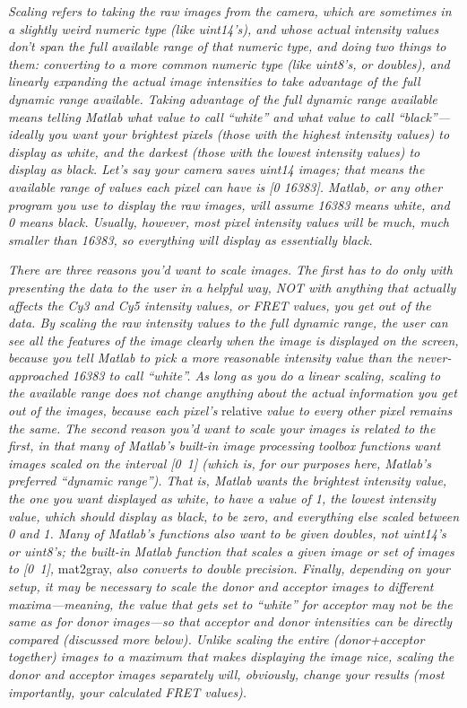 \documentclass[11pt]{article}
\begin{document}
{\it Scaling refers to taking the raw images from the camera, which are sometimes in a slightly weird numeric type (like uint14's), and whose actual intensity values don't span the full available range of that numeric type, and doing two things to them: converting to a more common numeric type (like uint8's, or doubles), and linearly expanding the actual image intensities to take advantage of the full dynamic range available.  Taking advantage of the full dynamic range available means telling Matlab what value to call ``white'' and what value to call ``black''---ideally you want your brightest pixels (those with the highest intensity values) to display as white, and the darkest (those with the lowest intensity values) to display as black.  Let's say your camera saves uint14 images; that means the available range of values each pixel can have is [0 16383].  Matlab, or any other program you use to display the raw images, will assume 16383 means white, and 0 means black.  Usually, however, most pixel intensity values will be much, much smaller than 16383, so everything will display as essentially black.}

{\it There are three reasons you'd want to scale images.  The first has to do only with presenting the data to the user in a helpful way, NOT with anything that actually affects the Cy3 and Cy5 intensity values, or FRET values, you get out of the data.  By scaling the raw intensity values to the full dynamic range, the user can see all the features of the image clearly when the image is displayed on the screen, because you tell Matlab to pick a more reasonable intensity value than the never-approached 16383 to call ``white''.  As long as you do a linear scaling, scaling to the available range does not change anything about the actual information you get out of the images, because each pixel's} relative {\it value to every other pixel remains the same.  The second reason you'd want to scale your images is related to the first, in that many of Matlab's built-in image processing toolbox functions want images scaled on the interval [0~1] (which is, for our purposes here, Matlab's preferred ``dynamic range'').  That is, Matlab wants the brightest intensity value, the one you want displayed as white, to have a value of 1, the lowest intensity value, which should display as black, to be zero, and everything else scaled between 0 and 1. Many of Matlab's functions also want to be given doubles, not uint14's or uint8's; the built-in Matlab function that scales a given image or set of images to [0~1],} mat2gray, {\it also converts to double precision.  Finally, depending on your setup, it may be necessary to scale the donor and acceptor images to different maxima---meaning, the value that gets set to ``white'' for acceptor may not be the same as for donor images---so that acceptor and donor intensities can be directly compared (discussed more below).  Unlike scaling the entire (donor+acceptor together) images to a maximum that makes displaying the image nice, scaling the donor and acceptor images separately will, obviously, change your results (most importantly, your calculated FRET values).}
\end{document}
